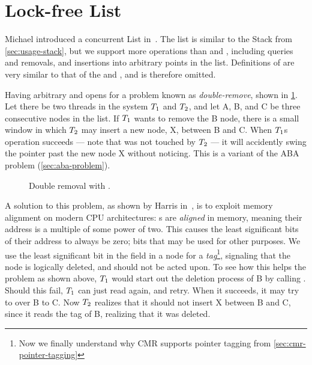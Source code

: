 \section{Lock-free List}

Michael introduced a concurrent List in~\cite{harris2001pragmatic}. The list is similar to the
Stack from \cref{sec:usage-stack}, but we support more operations than  and ,
including queries and removals, and insertions into arbitrary points in the list. Definitions of
 are very similar to that of the  and , and is therefore
omitted.

Having arbitrary  and  opens for a problem known as \emph{double-remove},
shown in \cref{fig:list-remove}. Let there be two threads in the system $T\sb{1}$ and $T\sb{2}$,
and let A, B, and C be three consecutive nodes in the list. If $T\sb{1}$ wants to remove the B
node, there is a small window in which $T\sb{2}$ may insert a new node, X, between B and C. When
$T\sb{1}$s  operation succeeds --- note that  was not touched by $T\sb{2}$
--- it will accidently swing the pointer past the new node X without noticing. This is a variant of
the ABA problem (\cref{sec:aba-problem}).

\begin{figure}[ht]
\centering

\caption{Double removal with \label{fig:list-remove}.}
\end{figure}

A solution to this problem, as shown by Harris in~\cite{michael2002high}, is to exploit memory
alignment on modern CPU architectures: s are \emph{aligned} in memory, meaning their
address is a multiple of some power of two. This causes the least significant bits of their address
to always be zero; bits that may be used for other purposes. We use the least significant bit in
the  field in a node for a \emph{tag}\footnote{Now we finally understand why CMR
supports pointer tagging from \cref{sec:cmr-pointer-tagging}}, signaling that the node is logically
deleted, and should not be acted upon. To see how this helps the problem as shown above, $T\sb{1}$
would start out the deletion process of B by calling . Should
this fail, $T\sb{1}$ can just read  again, and retry. When it succeeds, it may try to
  over B to C. Now $T\sb{2}$ realizes that it should not insert X between B
and C, since it reads the tag of B, realizing that it was deleted.


